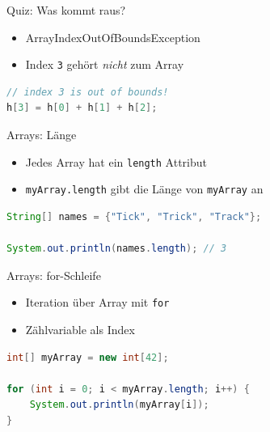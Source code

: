 \documentclass[18pt]{beamer}
\begin{document}
\begin{frame}[fragile]{Quiz: Was kommt raus?}

    \begin{itemize}
        \item \alert{ArrayIndexOutOfBoundsException}
        \item Index \texttt{3} gehört \textit{nicht} zum Array
    \end{itemize}

    \begin{alertblock}{}
        \begin{lstlisting}[language=Java]
// index 3 is out of bounds!
h[3] = h[0] + h[1] + h[2];
        \end{lstlisting}
    \end{alertblock}
\end{frame}

\begin{frame}[fragile]{Arrays: Länge}

    \begin{itemize}
        \item Jedes Array hat ein \texttt{length} Attribut
        \item \texttt{myArray.length} gibt die Länge von \texttt{myArray} an
    \end{itemize}

\begin{exampleblock}{}
    \begin{lstlisting}[language=Java]
String[] names = {"Tick", "Trick", "Track"};

System.out.println(names.length); // 3
    \end{lstlisting}
\end{exampleblock}
\end{frame}

\begin{frame}[fragile]{Arrays: for-Schleife}
    \begin{itemize}
        \item Iteration über Array mit \texttt{for}
        \item Zählvariable als Index
    \end{itemize}

    \begin{exampleblock}{}
        \begin{lstlisting}[language=Java]
int[] myArray = new int[42];

for (int i = 0; i < myArray.length; i++) {
    System.out.println(myArray[i]);
}
        \end{lstlisting}
    \end{exampleblock}
\end{frame}
\end{document}
